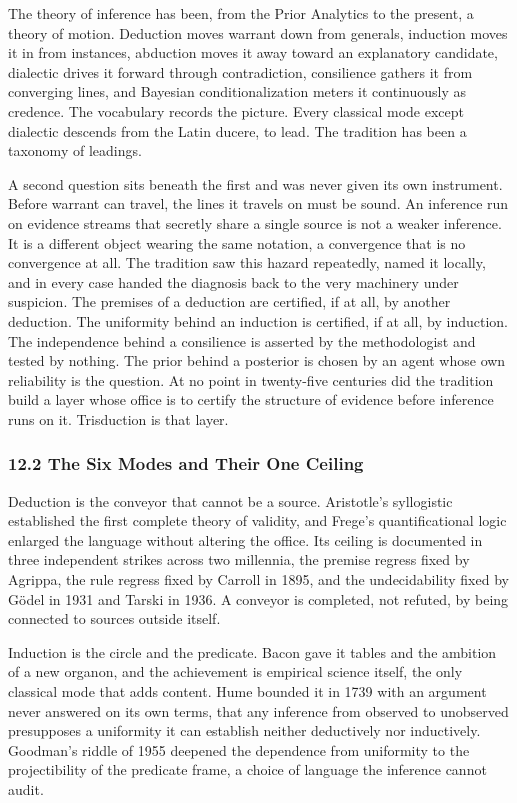 \documentclass[10pt,twocolumn]{article}
\begin{document}
The theory of inference has been, from the Prior Analytics to the
present, a theory of motion. Deduction moves warrant down from generals,
induction moves it in from instances, abduction moves it away toward an
explanatory candidate, dialectic drives it forward through
contradiction, consilience gathers it from converging lines, and
Bayesian conditionalization meters it continuously as credence. The
vocabulary records the picture. Every classical mode except dialectic
descends from the Latin ducere, to lead. The tradition has been a
taxonomy of leadings.

A second question sits beneath the first and was never given its own
instrument. Before warrant can travel, the lines it travels on must be
sound. An inference run on evidence streams that secretly share a single
source is not a weaker inference. It is a different object wearing the
same notation, a convergence that is no convergence at all. The
tradition saw this hazard repeatedly, named it locally, and in every
case handed the diagnosis back to the very machinery under suspicion.
The premises of a deduction are certified, if at all, by another
deduction. The uniformity behind an induction is certified, if at all,
by induction. The independence behind a consilience is asserted by the
methodologist and tested by nothing. The prior behind a posterior is
chosen by an agent whose own reliability is the question. At no point in
twenty-five centuries did the tradition build a layer whose office is to
certify the structure of evidence before inference runs on it.
Trisduction is that layer.

\hypertarget{the-six-modes-and-their-one-ceiling}{%
\subsubsection{12.2 The Six Modes and Their One
Ceiling}\label{the-six-modes-and-their-one-ceiling}}

Deduction is the conveyor that cannot be a source. Aristotle's
syllogistic established the first complete theory of validity, and
Frege's quantificational logic enlarged the language without altering
the office. Its ceiling is documented in three independent strikes
across two millennia, the premise regress fixed by Agrippa, the rule
regress fixed by Carroll in 1895, and the undecidability fixed by Gödel
in 1931 and Tarski in 1936. A conveyor is completed, not refuted, by
being connected to sources outside itself.

Induction is the circle and the predicate. Bacon gave it tables and the
ambition of a new organon, and the achievement is empirical science
itself, the only classical mode that adds content. Hume bounded it in
1739 with an argument never answered on its own terms, that any
inference from observed to unobserved presupposes a uniformity it can
establish neither deductively nor inductively. Goodman's riddle of 1955
deepened the dependence from uniformity to the projectibility of the
predicate frame, a choice of language the inference cannot audit.
\end{document}
